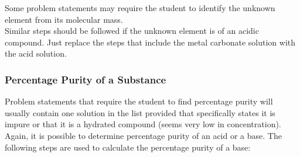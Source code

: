Some problem statements may require the student to identify the unknown element from its molecular mass.\\
Similar steps should be followed if the unknown element is of an acidic compound. Just replace the steps that include the metal carbonate solution with the acid solution.


\subsubsection{Percentage Purity of a Substance}

Problem statements that require the student to find percentage purity will usually contain one solution in the list provided that specifically states it is impure or that it is a hydrated compound (seems very low in concentration). Again, it is possible to determine percentage purity of an acid or a base. The following steps are used to calculate the percentage purity of a base:

